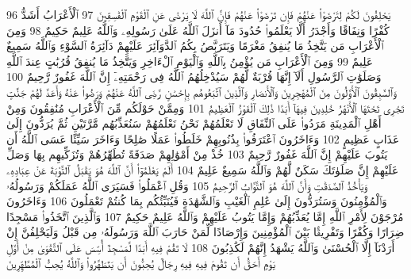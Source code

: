 {\tiny\colorbox{cl_aya}{96}} يَحْلِفُونَ لَكُمْ لِتَرْضَوْا۟ عَنْهُمْ فَإِن تَرْضَوْا۟ عَنْهُمْ فَإِنَّ ٱللَّهَ لَا يَرْضَىٰ عَنِ ٱلْقَوْمِ ٱلْفَٰسِقِينَ
{\tiny\colorbox{cl_aya}{97}} ٱلْأَعْرَابُ أَشَدُّ كُفْرًا وَنِفَاقًا وَأَجْدَرُ أَلَّا يَعْلَمُوا۟ حُدُودَ مَآ أَنزَلَ ٱللَّهُ عَلَىٰ رَسُولِهِۦ وَٱللَّهُ عَلِيمٌ حَكِيمٌ
{\tiny\colorbox{cl_aya}{98}} وَمِنَ ٱلْأَعْرَابِ مَن يَتَّخِذُ مَا يُنفِقُ مَغْرَمًا وَيَتَرَبَّصُ بِكُمُ ٱلدَّوَآئِرَ عَلَيْهِمْ دَآئِرَةُ ٱلسَّوْءِ وَٱللَّهُ سَمِيعٌ عَلِيمٌ
{\tiny\colorbox{cl_aya}{99}} وَمِنَ ٱلْأَعْرَابِ مَن يُؤْمِنُ بِٱللَّهِ وَٱلْيَوْمِ ٱلْءَاخِرِ وَيَتَّخِذُ مَا يُنفِقُ قُرُبَٰتٍ عِندَ ٱللَّهِ وَصَلَوَٰتِ ٱلرَّسُولِ أَلَآ إِنَّهَا قُرْبَةٌ لَّهُمْ سَيُدْخِلُهُمُ ٱللَّهُ فِى رَحْمَتِهِۦٓ إِنَّ ٱللَّهَ غَفُورٌ رَّحِيمٌ
{\tiny\colorbox{cl_aya}{100}} وَٱلسَّٰبِقُونَ ٱلْأَوَّلُونَ مِنَ ٱلْمُهَٰجِرِينَ وَٱلْأَنصَارِ وَٱلَّذِينَ ٱتَّبَعُوهُم بِإِحْسَٰنٍ رَّضِىَ ٱللَّهُ عَنْهُمْ وَرَضُوا۟ عَنْهُ وَأَعَدَّ لَهُمْ جَنَّٰتٍ تَجْرِى تَحْتَهَا ٱلْأَنْهَٰرُ خَٰلِدِينَ فِيهَآ أَبَدًا ذَٰلِكَ ٱلْفَوْزُ ٱلْعَظِيمُ
{\tiny\colorbox{cl_aya}{101}} وَمِمَّنْ حَوْلَكُم مِّنَ ٱلْأَعْرَابِ مُنَٰفِقُونَ وَمِنْ أَهْلِ ٱلْمَدِينَةِ مَرَدُوا۟ عَلَى ٱلنِّفَاقِ لَا تَعْلَمُهُمْ نَحْنُ نَعْلَمُهُمْ سَنُعَذِّبُهُم مَّرَّتَيْنِ ثُمَّ يُرَدُّونَ إِلَىٰ عَذَابٍ عَظِيمٍ
{\tiny\colorbox{cl_aya}{102}} وَءَاخَرُونَ ٱعْتَرَفُوا۟ بِذُنُوبِهِمْ خَلَطُوا۟ عَمَلًا صَٰلِحًا وَءَاخَرَ سَيِّئًا عَسَى ٱللَّهُ أَن يَتُوبَ عَلَيْهِمْ إِنَّ ٱللَّهَ غَفُورٌ رَّحِيمٌ
{\tiny\colorbox{cl_aya}{103}} خُذْ مِنْ أَمْوَٰلِهِمْ صَدَقَةً تُطَهِّرُهُمْ وَتُزَكِّيهِم بِهَا وَصَلِّ عَلَيْهِمْ إِنَّ صَلَوٰتَكَ سَكَنٌ لَّهُمْ وَٱللَّهُ سَمِيعٌ عَلِيمٌ
{\tiny\colorbox{cl_aya}{104}} أَلَمْ يَعْلَمُوٓا۟ أَنَّ ٱللَّهَ هُوَ يَقْبَلُ ٱلتَّوْبَةَ عَنْ عِبَادِهِۦ وَيَأْخُذُ ٱلصَّدَقَٰتِ وَأَنَّ ٱللَّهَ هُوَ ٱلتَّوَّابُ ٱلرَّحِيمُ
{\tiny\colorbox{cl_aya}{105}} وَقُلِ ٱعْمَلُوا۟ فَسَيَرَى ٱللَّهُ عَمَلَكُمْ وَرَسُولُهُۥ وَٱلْمُؤْمِنُونَ وَسَتُرَدُّونَ إِلَىٰ عَٰلِمِ ٱلْغَيْبِ وَٱلشَّهَٰدَةِ فَيُنَبِّئُكُم بِمَا كُنتُمْ تَعْمَلُونَ
{\tiny\colorbox{cl_aya}{106}} وَءَاخَرُونَ مُرْجَوْنَ لِأَمْرِ ٱللَّهِ إِمَّا يُعَذِّبُهُمْ وَإِمَّا يَتُوبُ عَلَيْهِمْ وَٱللَّهُ عَلِيمٌ حَكِيمٌ
{\tiny\colorbox{cl_aya}{107}} وَٱلَّذِينَ ٱتَّخَذُوا۟ مَسْجِدًا ضِرَارًا وَكُفْرًا وَتَفْرِيقًۢا بَيْنَ ٱلْمُؤْمِنِينَ وَإِرْصَادًا لِّمَنْ حَارَبَ ٱللَّهَ وَرَسُولَهُۥ مِن قَبْلُ وَلَيَحْلِفُنَّ إِنْ أَرَدْنَآ إِلَّا ٱلْحُسْنَىٰ وَٱللَّهُ يَشْهَدُ إِنَّهُمْ لَكَٰذِبُونَ
{\tiny\colorbox{cl_aya}{108}} لَا تَقُمْ فِيهِ أَبَدًا لَّمَسْجِدٌ أُسِّسَ عَلَى ٱلتَّقْوَىٰ مِنْ أَوَّلِ يَوْمٍ أَحَقُّ أَن تَقُومَ فِيهِ فِيهِ رِجَالٌ يُحِبُّونَ أَن يَتَطَهَّرُوا۟ وَٱللَّهُ يُحِبُّ ٱلْمُطَّهِّرِينَ
